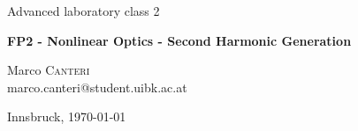 \documentclass[a4paper,10pt]{article}
\begin{document}
\begin{titlepage}
 \begin{center}
	\Large{Advanced laboratory class 2}
	\end{center}
	\begin{center}
	 \LARGE{\textbf{FP2 - Nonlinear Optics - Second Harmonic Generation}}
	\end{center}
	
	\begin{center}
	
	\large Marco \textsc{Canteri} \\
	marco.canteri@student.uibk.ac.at
	\end{center}
	
	\begin{center}
	\vspace{1cm}
	Innsbruck, \today
	\vspace{2cm}
	\end{center}
	

\end{titlepage}
\end{document}
